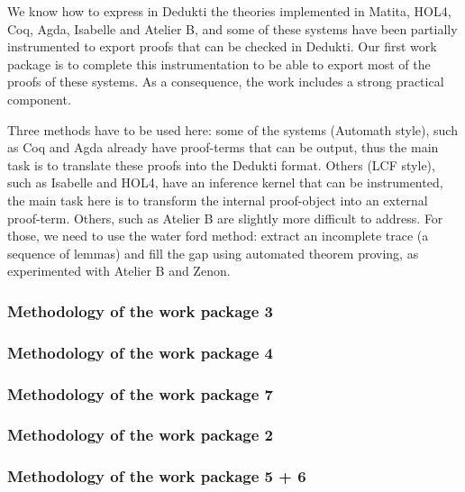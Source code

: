 We know how to express in Dedukti the theories implemented in Matita,
HOL4, Coq, Agda, Isabelle and Atelier B, and some of these systems
have been partially instrumented to export proofs that can be checked
in Dedukti. Our first work package is to complete this instrumentation
to be able to export most of the proofs of these systems. As a
consequence, the work includes a strong practical component.

Three methods have to be used here: some of the systems (Automath
style), such as Coq and Agda already have proof-terms that can be
output, thus the main task is to translate these proofs into the
Dedukti format. Others (LCF style), such as Isabelle and HOL4, have an
inference kernel that can be instrumented, the main task here is to
transform the internal proof-object into an external
proof-term. Others, such as Atelier B are slightly more difficult to
address. For those, we need to use the water ford method: extract an
incomplete trace (a sequence of lemmas) and fill the gap using
automated theorem proving, as experimented with Atelier B and Zenon.


\subsubsection{Methodology of the work package 3} 

\subsubsection{Methodology of the work package 4} 

\subsubsection{Methodology of the work package 7} 

\subsubsection{Methodology of the work package 2} 

\subsubsection{Methodology of the work package 5 + 6} 

